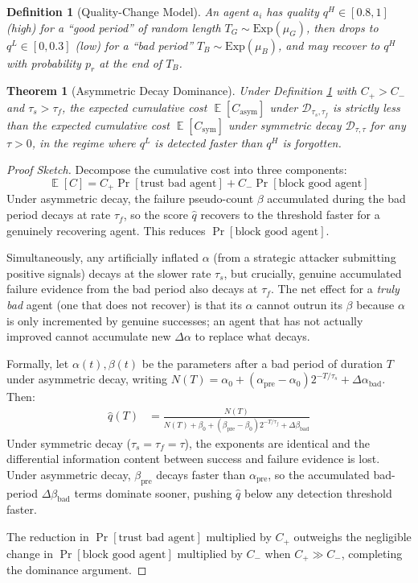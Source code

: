 \documentclass[conference]{IEEEtran}
\newtheorem{theorem}{Theorem}
\newtheorem{definition}{Definition}
\DeclareMathOperator{\E}{\mathbb{E}}
\begin{document}
\begin{definition}[Quality-Change Model]
\label{def:quality_model}
An agent $a_i$ has quality $q^H \in [0.8, 1]$ (high) for
a ``good period'' of random length $T_G \sim \text{Exp}(\mu_G)$,
then drops to $q^L \in [0, 0.3]$ (low) for a ``bad period''
$T_B \sim \text{Exp}(\mu_B)$, and may recover to $q^H$ with
probability $p_r$ at the end of $T_B$.
\end{definition}

\begin{theorem}[Asymmetric Decay Dominance]
\label{thm:dominance}
Under Definition \ref{def:quality_model} with $C_+ > C_-$
and $\tau_s > \tau_f$, the expected cumulative cost
$\E[C_{\text{asym}}]$ under $\mathcal{D}_{\tau_s,\tau_f}$
is strictly less than the expected cumulative cost
$\E[C_{\text{sym}}]$ under symmetric decay $\mathcal{D}_{\tau,\tau}$
for any $\tau > 0$, in the regime where $q^L$ is detected
faster than $q^H$ is forgotten.
\end{theorem}
\begin{proof}[Proof Sketch]
Decompose the cumulative cost into three components:
\begin{equation}
  \E[C] = C_+ \Pr[\text{trust bad agent}] +
           C_- \Pr[\text{block good agent}]
\end{equation}
Under asymmetric decay, the failure pseudo-count $\beta$
accumulated during the bad period decays at rate $\tau_f$,
so the score $\hat{q}$ recovers to the threshold faster for a
genuinely recovering agent. This reduces $\Pr[\text{block
good agent}]$.

Simultaneously, any artificially inflated $\alpha$ (from a
strategic attacker submitting positive signals) decays at
the slower rate $\tau_s$, but crucially, genuine accumulated
failure evidence from the bad period also decays at $\tau_f$.
The net effect for a \emph{truly bad} agent (one that does
not recover) is that its $\alpha$ cannot outrun its $\beta$
because $\alpha$ is only incremented by genuine successes;
an agent that has not actually improved cannot accumulate
new $\Delta\alpha$ to replace what decays.

Formally, let $\alpha(t), \beta(t)$ be the parameters after
a bad period of duration $T$ under asymmetric decay, writing
$N(T) = \alpha_0 + (\alpha_{\text{pre}}-\alpha_0)2^{-T/\tau_s}
+ \Delta\alpha_{\text{bad}}$. Then:
\begin{align}
  \hat{q}(T) &= \frac{N(T)}{N(T) + \beta_0
    + (\beta_{\text{pre}}-\beta_0)2^{-T/\tau_f}
    + \Delta\beta_{\text{bad}}}
  \label{eq:qT}
\end{align}
Under symmetric decay ($\tau_s = \tau_f = \tau$), the
exponents are identical and the differential information
content between success and failure evidence is lost.
Under asymmetric decay, $\beta_{\text{pre}}$ decays faster
than $\alpha_{\text{pre}}$, so the accumulated bad-period
$\Delta\beta_{\text{bad}}$ terms dominate sooner, pushing
$\hat{q}$ below any detection threshold faster.

The reduction in $\Pr[\text{trust bad agent}]$ multiplied
by $C_+$ outweighs the negligible change in
$\Pr[\text{block good agent}]$ multiplied by $C_-$ when
$C_+ \gg C_-$, completing the dominance argument.
\end{proof}
\end{document}
